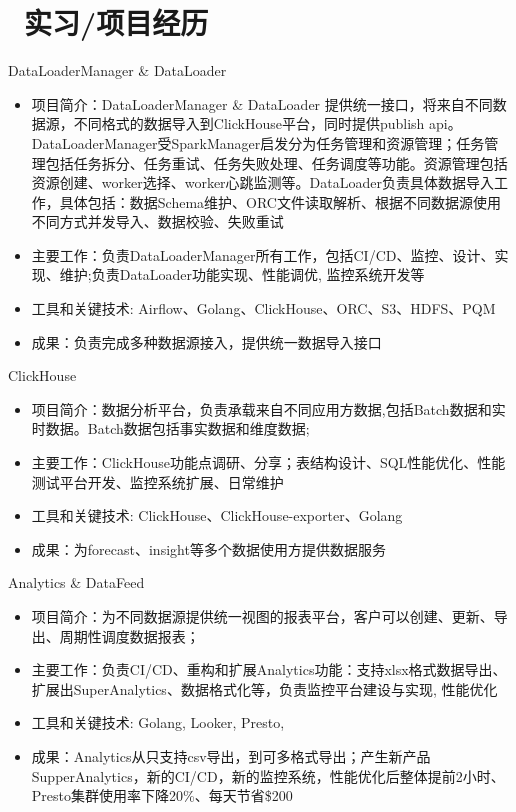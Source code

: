 \documentclass{resume}
\begin{document}
\section{\faUsers\ 实习/项目经历}
DataLoaderManager \& DataLoader
\begin{itemize}
  \item 项目简介：DataLoaderManager \& DataLoader 提供统一接口，将来自不同数据源，不同格式的数据导入到ClickHouse平台，同时提供publish api。DataLoaderManager受SparkManager启发分为任务管理和资源管理；任务管理包括任务拆分、任务重试、任务失败处理、任务调度等功能。资源管理包括资源创建、worker选择、worker心跳监测等。DataLoader负责具体数据导入工作，具体包括：数据Schema维护、ORC文件读取解析、根据不同数据源使用不同方式并发导入、数据校验、失败重试
  \item 主要工作：负责DataLoaderManager所有工作，包括CI/CD、监控、设计、实现、维护;负责DataLoader功能实现、性能调优, 监控系统开发等
  \item 工具和关键技术: Airflow、Golang、ClickHouse、ORC、S3、HDFS、PQM
  \item 成果：负责完成多种数据源接入，提供统一数据导入接口
\end{itemize}
ClickHouse
\begin{itemize}
  \item 项目简介：数据分析平台，负责承载来自不同应用方数据,包括Batch数据和实时数据。Batch数据包括事实数据和维度数据;
  \item 主要工作：ClickHouse功能点调研、分享；表结构设计、SQL性能优化、性能测试平台开发、监控系统扩展、日常维护
  \item 工具和关键技术: ClickHouse、ClickHouse-exporter、Golang
  \item 成果：为forecast、insight等多个数据使用方提供数据服务
\end{itemize}
Analytics \& DataFeed
\begin{itemize}
  \item 项目简介：为不同数据源提供统一视图的报表平台，客户可以创建、更新、导出、周期性调度数据报表；
  \item 主要工作：负责CI/CD、重构和扩展Analytics功能：支持xlsx格式数据导出、扩展出SuperAnalytics、数据格式化等，负责监控平台建设与实现, 性能优化
  \item 工具和关键技术: Golang, Looker, Presto, 
  \item 成果：Analytics从只支持csv导出，到可多格式导出；产生新产品SupperAnalytics，新的CI/CD，新的监控系统，性能优化后整体提前2小时、Presto集群使用率下降20\%、每天节省\$200
\end{itemize}
\end{document}
